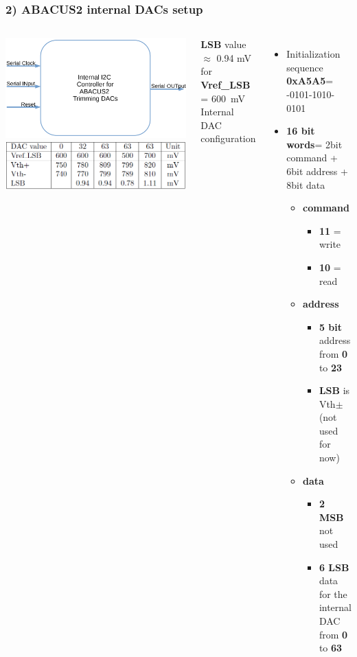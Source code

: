 \documentclass[aspectratio=169]{beamer}
\begin{document}
	\begin{frame}
		\frametitle{2) ABACUS2 internal DACs setup}	
		\begin{columns}
			\begin{center}
				\includegraphics[width=0.7 \textwidth]{IMG2/INTERNALDAC}
				\includegraphics[width=0.7 \textwidth]{IMG/TableLSB.PNG}
			\end{center}
			\textbf{LSB} value $\approx$ 0.94 mV for \textbf{Vref\_LSB} = 600~mV
			{\color{blue} Internal DAC configuration}
			\begin{itemize}
				\item Initialization sequence \textbf{0xA5A5}= 
				-0101-1010-0101
				\item \textbf{16 bit words}= \newline 2bit command + 6bit address + 8bit data
				\begin{itemize}
					\item \textbf{command}
					\begin{itemize}
						\item \textbf{11} = write
						\item \textbf{10} = read
					\end{itemize}
					\item \textbf{address}
					\begin{itemize}
						\item \textbf{5 bit} address from \textbf{0} to \textbf{23}
						\item \textbf{LSB} is Vth$\pm$ (not used for now)
					\end{itemize}
					\item \textbf{data}
					\begin{itemize}
						\item \textbf{2 MSB} not used
						\item \textbf{6 LSB} data for the internal DAC \newline from \textbf{0} to \textbf{63}
					\end{itemize}
				\end{itemize} 
			\end{itemize}
		\end{columns}
	\end{frame}
\end{document}
